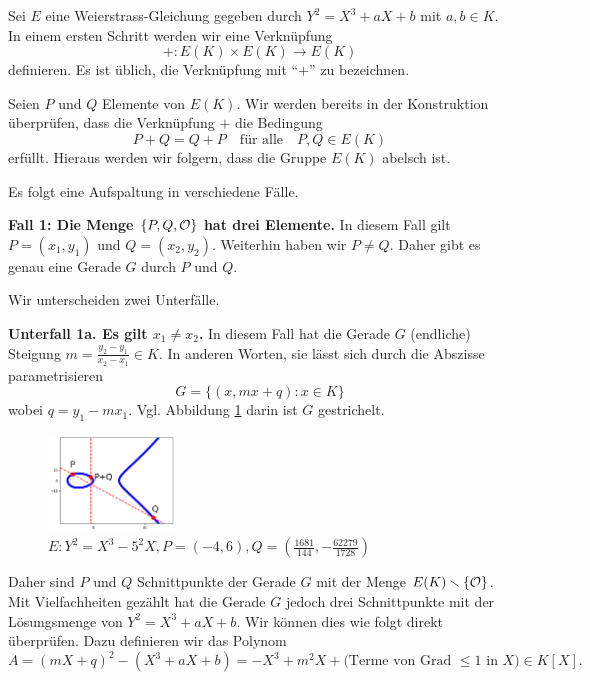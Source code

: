 Sei $E$ eine Weierstrass-Gleichung gegeben durch $Y^2 = X^3+aX+b$ mit
$a,b\in K$. 
In einem ersten Schritt werden wir eine Verknüpfung
\begin{equation*}
  + \colon E(K)\times E(K) \rightarrow E(K)
\end{equation*}
definieren. Es ist üblich, die Verknüpfung mit ``$+$'' zu bezeichnen.

Seien $P$ und $Q$ Elemente von $E(K)$. Wir werden bereits in der
Konstruktion überprüfen, dass die Verknüpfung $+$ die Bedingung
$$
P+Q=Q+P\quad\text{für alle}\quad P,Q\in E(K)
$$
erfüllt. Hieraus werden wir folgern, dass die Gruppe $E(K)$ abelsch
ist.

Es folgt eine Aufspaltung in verschiedene Fälle.

\medskip
\textbf{Fall 1: Die Menge $\{P,Q,{\mathcal O}\}$ hat drei Elemente.} In diesem
Fall gilt $P = (x_1,y_1)$ und $Q = (x_2,y_2)$. Weiterhin haben wir
$P\not=Q$.
Daher gibt es genau eine Gerade $G$ durch $P$ und $Q$.

Wir unterscheiden zwei Unterfälle. 

\textbf{Unterfall 1a. Es gilt $x_1\not=x_2$.} In diesem Fall hat die
Gerade $G$ (endliche) Steigung $m = \frac{y_2-y_1}{x_2-x_1}\in K$. In
anderen Worten, sie lässt sich durch die Abszisse parametrisieren
\begin{equation*}
  G = \{(x,mx+q) : x\in K \}
\end{equation*}
wobei $q=y_1-m x_1$. Vgl. Abbildung \ref{fig:unterfall1a} darin ist $G$
gestrichelt.

\begin{figure}[h]
  \centering    
  \caption{$E: Y^2 = X^3-5^2 X,P = (-4,6),Q = (\frac{1681}{144},-\frac{62279}{1728})$}
  \label{fig:unterfall1a}
  \includegraphics[width=0.3\textwidth]{./plots/unterfall1a.png}
\end{figure}
 
Daher sind $P$ und $Q$ Schnittpunkte der Gerade $G$ mit der Menge
$E(K)\smallsetminus \{{\mathcal O}\}$. Mit Vielfachheiten gezählt hat die Gerade $G$
jedoch drei Schnittpunkte mit der Lösungsmenge von $Y^2=X^3+aX+b$. Wir
können dies wie folgt direkt überprüfen. Dazu definieren wir
das Polynom
\begin{equation*}
  A = (mX+q)^2 - (X^3+aX+b) =-X^3+m^2X +\text{(Terme von Grad $\le 1$ in $X$)}
  \in K[X]. 
\end{equation*}

